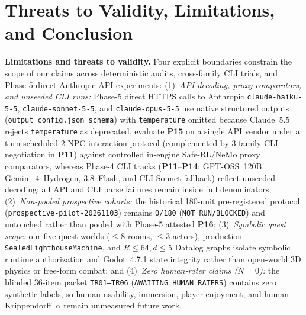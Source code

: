 \FloatBarrier
\section{Threats to Validity, Limitations, and Conclusion}\label{sec:conclusion}
\textbf{Limitations and threats to validity.} Four explicit boundaries constrain the scope of our claims across deterministic audits, cross-family CLI trials, and Phase-5 direct Anthropic API experiments:
(1)~\emph{API decoding, proxy comparators, and unseeded CLI runs:} Phase-5 direct HTTPS calls to Anthropic \texttt{claude-haiku-5-5}, \texttt{claude-sonnet-5-5}, and \texttt{claude-opus-5-5} use native structured outputs (\texttt{output\_config.json\_schema}) with \texttt{temperature} omitted because Claude~5.5 rejects \texttt{temperature} as deprecated, evaluate \textbf{P15} on a single API vendor under a turn-scheduled 2-NPC interaction protocol (complemented by 3-family CLI negotiation in \textbf{P11}) against controlled in-engine Safe-RL/NeMo proxy comparators, whereas Phase-4 CLI tracks (\textbf{P11}--\textbf{P14}: GPT-OSS~120B, Gemini~4~Hydrogen, 3.8~Flash, and CLI Sonnet fallback) reflect unseeded decoding; all API and CLI parse failures remain inside full denominators;
(2)~\emph{Non-pooled prospective cohorts:} the historical 180-unit pre-registered protocol (\texttt{prospective-pilot-20261103}) remains \texttt{0/180} (\texttt{NOT\_RUN/BLOCKED}) and untouched rather than pooled with Phase-5 attested \textbf{P16};
(3)~\emph{Symbolic quest scope:} our five quest worlds (${\le}8$ rooms, ${\le}3$ actors), production \texttt{Sealed\allowbreak Lighthouse\allowbreak Machine}, and $R{\le}64, d{\le}5$ Datalog graphs isolate symbolic runtime authorization and Godot~4.7.1 state integrity rather than open-world 3D physics or free-form combat; and
(4)~\emph{Zero human-rater claims ($N{=}0$):} the blinded 36-item packet \texttt{TR01--TR06} (\texttt{AWAITING\_}\allowbreak\texttt{HUMAN\_}\allowbreak\texttt{RATERS}) contains zero synthetic labels, so human usability, immersion, player enjoyment, and human Krippendorff~$\alpha$ remain unmeasured future work.

